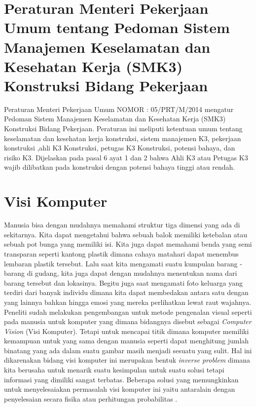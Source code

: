 \newpage

\section{Peraturan Menteri Pekerjaan Umum tentang Pedoman Sistem Manajemen Keselamatan dan Kesehatan Kerja (SMK3) Konstruksi Bidang Pekerjaan}
\label{sec:peraturansmk3}

\par Peraturan Menteri Pekerjaan Umum NOMOR : 05/PRT/M/2014 mengatur Pedoman Sistem Manajemen Keselamatan dan Kesehatan Kerja (SMK3) Konstruksi Bidang Pekerjaan.
Peraturan ini meliputi ketentuan umum tentang keselamatan dan kesehatan kerja konstruksi, sistem manajemen K3, pekerjaan konstruksi
,ahli K3 Konstruksi, petugas K3 Konstruksi, potensi bahaya, dan risiko K3. Dijelaskan pada pasal 6 ayat 1 dan 2 bahwa Ahli K3 atau Petugas K3 wajib dilibatkan pada konstruksi
dengan potensi bahaya tinggi atau rendah.

\section{Visi Komputer}
\label{sec:visikomputer}

\par Manusia bisa dengan mudahnya memahami struktur tiga dimensi yang ada di sekitarnya. Kita dapat mengetahui bahwa
sebuah balok memiliki ketebalan atau sebuah pot bunga yang memiliki isi. Kita juga dapat memahami benda yang semi transparan
seperti kantong plastik dimana cahaya matahari dapat menembus lembaran plastik tersebut. Lalu saat kita mengamati suatu kumpulan
barang - barang di gudang, kita juga dapat dengan mudahnya menentukan nama dari barang tersebut dan lokasinya. Begitu juga saat
mengamati foto keluarga yang terdiri dari banyak individu dimana kita dapat membedakan antara satu dengan yang lainnya bahkan hingga
emosi yang mereka perlihatkan lewat raut wajahnya. Peneliti sudah melakukan pengembangan untuk metode pengenalan visual seperti pada
manusia untuk komputer yang dimana bidangnya disebut sebagai \emph{Computer Vision} (Visi Komputer). Tetapi untuk mencapai titik dimana
komputer memiliki kemampuan untuk yang sama dengan manusia seperti dapat menghitung jumlah binatang yang ada dalam suatu gambar masih menjadi
sesuatu yang sulit. Hal ini dikarenakan bidang visi komputer ini merupakan bentuk \emph{inverse problem} dimana kita berusaha untuk menarik
suatu kesimpulan untuk suatu solusi tetapi informasi yang dimiliki sangat terbatas. Beberapa solusi yang memungkinkan untuk menyelesaiakan
permasalah visi komputer ini yaitu antaralain dengan penyelesaian secara fisika atau perhitungan probabilitas \cite{szeliski2010computer}.

